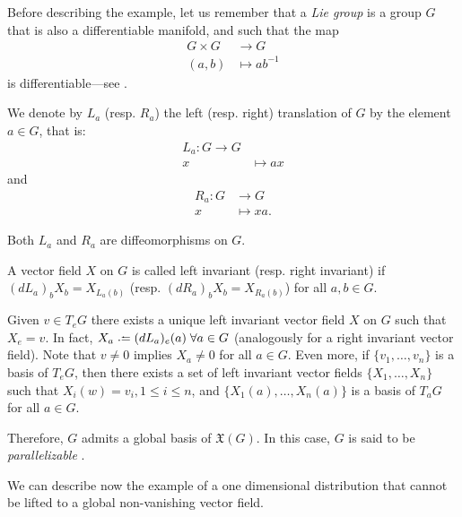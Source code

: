 \begin{remark}
	Before describing the example, let us remember that a \emph{Lie group} is a group $G$ that is also a differentiable manifold, and such that the map
	\begin{align*}
	G \times G &\to G \\
	(a,b) &\mapsto ab^{-1}
	\end{align*}
	is differentiable---see \cite[p. 38]{kobnom63}.
	
	We denote by $L_a$ (resp. $R_a$) the left (resp. right) translation of $G$ by the element $a\in G$, that is:
	\begin{align*}
	L_a \colon G \to G \\
	x &\mapsto ax
	\end{align*}
	and
	\begin{align*}
	R_a \colon G &\to G \\
	x &\mapsto xa.
	\end{align*}
	
	Both $L_a$ and $R_a$ are diffeomorphisms on $G$.
	
	A vector field $X$ on $G$ is called left invariant (resp. right invariant) if $(dL_a)_b X_b = X_{L_a(b)}$ (resp. $(dR_a)_b X_b = X_{R_a(b)}$) for all $a,b \in G$.
	
	Given $v \in T_e G$ there exists a unique left invariant vector field $X$ on $G$ such that $X_e = v$. In fact, $X_a \defeq (dL_a)_e(a) \; \forall a \in G$ (analogously for a right invariant vector field). Note that $v \neq 0$ implies $X_a \neq 0$ for all $a \in G$. Even more, if $\{v_1, \dots, v_n\}$ is a basis of $T_e G$, then there exists a set of left invariant vector fields $\{X_1, \dots, X_n\}$ such that $X_i(w) = v_i, 1 \leq i \leq n$, and  $\{X_1(a), \dots, X_n(a)\}$ is a basis of $T_a G$ for all $a \in G$.
	
	Therefore, $G$ admits a global basis of $\mathfrak{X}(G)$. In this case, $G$ is said to be \emph{parallelizable} \cite[Ch. 1, Sec. 4]{kobnom63}.
\end{remark}

We can describe now the example of a one dimensional distribution that cannot be lifted to a global non-vanishing vector field.

